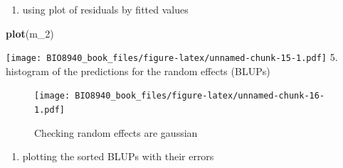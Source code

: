 \documentclass[
  12pt,
]{book}
\newenvironment{Shaded}{\begin{snugshade}}{\end{snugshade}}
\newcommand{\CommentTok}[1]{\textcolor[rgb]{0.56,0.35,0.01}{\textit{#1}}}
\newcommand{\DataTypeTok}[1]{\textcolor[rgb]{0.13,0.29,0.53}{#1}}
\newcommand{\DecValTok}[1]{\textcolor[rgb]{0.00,0.00,0.81}{#1}}
\newcommand{\KeywordTok}[1]{\textcolor[rgb]{0.13,0.29,0.53}{\textbf{#1}}}
\newcommand{\NormalTok}[1]{#1}
\newcommand{\OperatorTok}[1]{\textcolor[rgb]{0.81,0.36,0.00}{\textbf{#1}}}
\newcommand{\OtherTok}[1]{\textcolor[rgb]{0.56,0.35,0.01}{#1}}
\newcommand{\StringTok}[1]{\textcolor[rgb]{0.31,0.60,0.02}{#1}}
\providecommand{\tightlist}{%
  \setlength{\itemsep}{0pt}\setlength{\parskip}{0pt}}
\begin{document}
\begin{enumerate}
\def\labelenumi{\arabic{enumi}.}
\setcounter{enumi}{3}
\tightlist
\item
  using plot of residuals by fitted values
\end{enumerate}

\begin{Shaded}
\begin{Highlighting}[]
\KeywordTok{plot}\NormalTok{(m_}\DecValTok{2}\NormalTok{)}
\end{Highlighting}
\end{Shaded}

\texttt{[image: BIO8940\_book\_files/figure-latex/unnamed-chunk-15-1.pdf]}
5. histogram of the predictions for the random effects (BLUPs)

\begin{Shaded}
\end{Shaded}

\begin{figure}
\centering
\texttt{[image: BIO8940\_book\_files/figure-latex/unnamed-chunk-16-1.pdf]}
\caption{\label{fig:unnamed-chunk-16}Checking random effects are gaussian}
\end{figure}

\begin{enumerate}
\def\labelenumi{\arabic{enumi}.}
\setcounter{enumi}{5}
\tightlist
\item
  plotting the sorted BLUPs with their errors
\end{enumerate}
\end{document}
